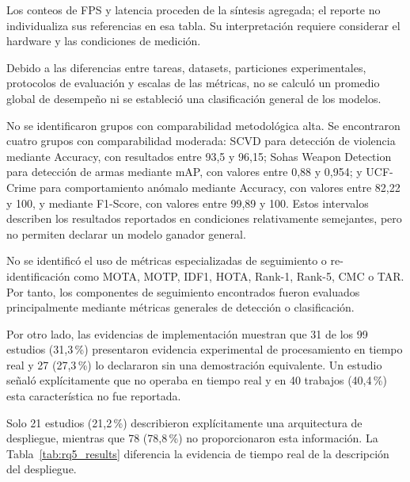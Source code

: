 \documentclass[pdflatex,sn-mathphys-num]{sn-jnl}%
\theoremstyle{thmstyleone}%
\theoremstyle{thmstyletwo}%
\theoremstyle{thmstylethree}%
\begin{document}
Los conteos de FPS y latencia proceden de la síntesis agregada; el reporte
no individualiza sus referencias en esa tabla. Su interpretación requiere
considerar el hardware y las condiciones de medición.

Debido a las diferencias entre tareas, datasets, particiones experimentales,
protocolos de evaluación y escalas de las métricas, no se calculó un promedio global
de desempeño ni se estableció una clasificación general de los modelos.

No se identificaron grupos con comparabilidad metodológica alta. Se encontraron
cuatro grupos con comparabilidad moderada: SCVD para detección de violencia mediante
Accuracy, con resultados entre 93,5 y 96,15; Sohas Weapon Detection para detección
de armas mediante mAP, con valores entre 0,88 y 0,954; y UCF-Crime para
comportamiento anómalo mediante Accuracy, con valores entre 82,22 y 100, y mediante
F1-Score, con valores entre 99,89 y 100. Estos intervalos describen los resultados
reportados en condiciones relativamente semejantes, pero no permiten declarar un
modelo ganador general.

No se identificó el uso de métricas especializadas de seguimiento o
re-identificación como MOTA, MOTP, IDF1, HOTA, Rank-1, Rank-5, CMC o TAR.
Por tanto, los componentes de seguimiento encontrados fueron evaluados principalmente
mediante métricas generales de detección o clasificación.

\FloatBarrier
Por otro lado, las evidencias de implementación muestran que 31 de los 99 estudios (31,3\,\%) presentaron evidencia experimental de
procesamiento en tiempo real y 27 (27,3\,\%) lo declararon sin una demostración
equivalente. Un estudio señaló explícitamente que no operaba en tiempo real y en
40 trabajos (40,4\,\%) esta característica no fue reportada.

Solo 21 estudios (21,2\,\%) describieron explícitamente una arquitectura de
despliegue, mientras que 78 (78,8\,\%) no proporcionaron esta información.
La Tabla~\ref{tab:rq5_results} diferencia la evidencia de tiempo real de la descripción del despliegue.
\end{document}
